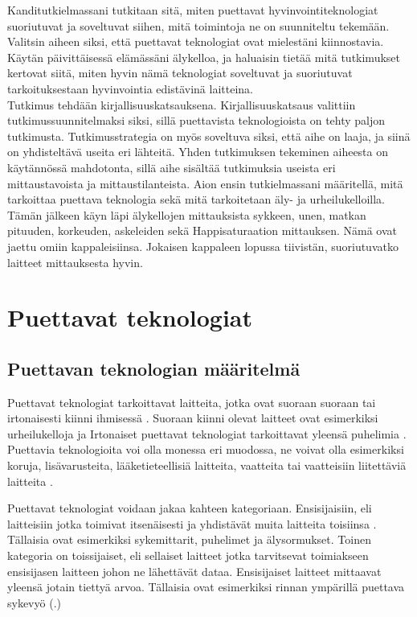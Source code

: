 \documentclass[utf8,bachelor,finnish]{bachelor}
\begin{document}
  Kanditutkielmassani tutkitaan sitä, miten puettavat hyvinvointiteknologiat suoriutuvat ja soveltuvat siihen, mitä toimintoja ne on suunniteltu tekemään.
   Valitsin aiheen siksi, että puettavat teknologiat ovat mielestäni kiinnostavia. Käytän päivittäisessä elämässäni älykelloa, ja haluaisin tietää mitä tutkimukset kertovat
    siitä, miten hyvin nämä teknologiat soveltuvat ja suoriutuvat tarkoituksestaan hyvinvointia edistävinä laitteina.\\
    
  Tutkimus tehdään kirjallisuuskatsauksena. Kirjallisuuskatsaus valittiin tutkimussuunnitelmaksi siksi, sillä puettavista teknologioista on tehty paljon tutkimusta.
   Tutkimusstrategia on myös soveltuva siksi, että aihe on laaja, ja siinä on yhdisteltävä useita eri lähteitä. Yhden tutkimuksen tekeminen aiheesta on käytännössä mahdotonta,
    sillä aihe sisältää tutkimuksia useista eri mittaustavoista ja mittaustilanteista. Aion ensin tutkielmassani määritellä, mitä tarkoittaa puettava teknologia
     sekä mitä tarkoitetaan äly- ja urheilukelloilla. Tämän jälkeen käyn läpi älykellojen mittauksista sykkeen, unen, matkan pituuden, korkeuden, askeleiden sekä
      Happisaturaation mittauksen. Nämä ovat jaettu omiin kappaleisiinsa. Jokaisen kappaleen lopussa tiivistän, suoriutuvatko laitteet mittauksesta hyvin.

   
\chapter{Puettavat teknologiat}

\section{Puettavan teknologian määritelmä}
  Puettavat teknologiat tarkoittavat laitteita, jotka ovat suoraan suoraan tai irtonaisesti
   kiinni ihmisessä \parencite{godfrey2018z}. Suoraan kiinni olevat laitteet ovat esimerkiksi urheilukelloja ja
    Irtonaiset puettavat teknologiat tarkoittavat yleensä puhelimia \parencite{godfrey2018z}. Puettavia teknologioita voi olla
     monessa eri muodossa, ne voivat olla esimerkiksi koruja, lisävarusteita, lääketieteellisiä laitteita, vaatteita tai
      vaatteisiin liitettäviä laitteita \parencite{Yasar_what_wearable}.
    
  Puettavat teknologiat voidaan jakaa kahteen kategoriaan. Ensisijaisiin, eli laitteisiin jotka toimivat itsenäisesti
   ja yhdistävät muita laitteita toisiinsa \parencite{godfrey2018z}. Tällaisia ovat esimerkiksi sykemittarit, puhelimet ja älysormukset.
    Toinen kategoria on toissijaiset, eli sellaiset laitteet jotka tarvitsevat toimiakseen ensisijasen laitteen johon ne lähettävät dataa. 
     Ensisijaiset laitteet mittaavat yleensä jotain tiettyä arvoa. Tällaisia ovat esimerkiksi rinnan ympärillä puettava sykevyö (\cite{godfrey2018z}.) \\
\end{document}
